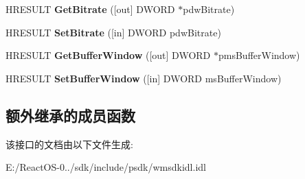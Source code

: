 \begin{DoxyCompactItemize}
\item 
\mbox{\label{interface_i_w_m_stream_config_ac95d70c1540879409b48c7dc72681fa2}} 
H\+R\+E\+S\+U\+LT {\bfseries Get\+Bitrate} (\mbox{[}out\mbox{]} D\+W\+O\+RD $\ast$pdw\+Bitrate)
\item 
\mbox{\label{interface_i_w_m_stream_config_acf485a39ec4d4e85c944f59c4ef0b5b1}} 
H\+R\+E\+S\+U\+LT {\bfseries Set\+Bitrate} (\mbox{[}in\mbox{]} D\+W\+O\+RD pdw\+Bitrate)
\item 
\mbox{\label{interface_i_w_m_stream_config_af79b3d20f2b6b6638da20f9575ee90d1}} 
H\+R\+E\+S\+U\+LT {\bfseries Get\+Buffer\+Window} (\mbox{[}out\mbox{]} D\+W\+O\+RD $\ast$pms\+Buffer\+Window)
\item 
\mbox{\label{interface_i_w_m_stream_config_af5683ca1abdb7d15b3d29d59de710baf}} 
H\+R\+E\+S\+U\+LT {\bfseries Set\+Buffer\+Window} (\mbox{[}in\mbox{]} D\+W\+O\+RD ms\+Buffer\+Window)
\end{DoxyCompactItemize}
\subsection*{额外继承的成员函数}


该接口的文档由以下文件生成\+:\begin{DoxyCompactItemize}
\item 
E\+:/\+React\+O\+S-\/0../sdk/include/psdk/wmsdkidl.\+idl\end{DoxyCompactItemize}
